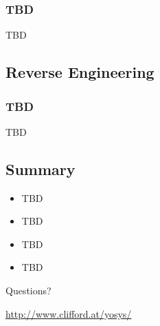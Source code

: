 \begin{frame}
\subsectionpage
\subsectionpagesuffix
\end{frame}

\subsubsection{TBD}

\begin{frame}{\subsubsecname}
TBD
\end{frame}


\subsection{Reverse Engineering}

\begin{frame}
\subsectionpage
\subsectionpagesuffix
\end{frame}

\subsubsection{TBD}

\begin{frame}{\subsubsecname}
TBD
\end{frame}


\subsection{Summary}

\begin{frame}{\subsecname}
\begin{itemize}
\item TBD
\item TBD
\item TBD
\item TBD
\end{itemize}

\bigskip
\bigskip
\begin{center}
Questions?
\end{center}

\bigskip
\bigskip
\begin{center}
\url{http://www.clifford.at/yosys/}
\end{center}
\end{frame}

